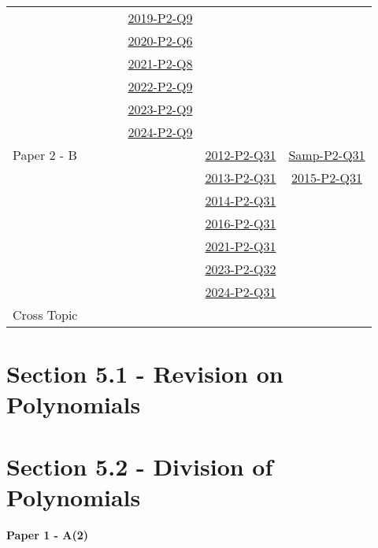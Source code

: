 \documentclass[12pt, a4paper]{article}
\begin{document}
\begin{absolutelynopagebreak}
\begin{center}
\begin{tabular}{|l|c|c|c|c|c|c|}
&  &  &  & \hyperref[DSE2019-CoreP2-Q09]{2019-P2-Q9} &  &  \\
&  &  &  & \hyperref[DSE2020-CoreP2-Q06]{2020-P2-Q6} &  &  \\
&  &  &  & \hyperref[DSE2021-CoreP2-Q08]{2021-P2-Q8} &  &  \\
&  &  &  & \hyperref[DSE2022-CoreP2-Q09]{2022-P2-Q9} &  &  \\
&  &  &  & \hyperref[DSE2023-CoreP2-Q09]{2023-P2-Q9} &  &  \\
&  &  &  & \hyperref[DSE2024-CoreP2-Q09]{2024-P2-Q9} &  &  \\
\hline
Paper 2 - B&  &  &  &  & \hyperref[DSE2012-CoreP2-Q31]{2012-P2-Q31} & \hyperref[DSE2012S-CoreP2-Q31]{Samp-P2-Q31} \\
&  &  &  &  & \hyperref[DSE2013-CoreP2-Q31]{2013-P2-Q31} & \hyperref[DSE2015-CoreP2-Q31]{2015-P2-Q31} \\
&  &  &  &  & \hyperref[DSE2014-CoreP2-Q31]{2014-P2-Q31} &  \\
&  &  &  &  & \hyperref[DSE2016-CoreP2-Q31]{2016-P2-Q31} &  \\
&  &  &  &  & \hyperref[DSE2021-CoreP2-Q31]{2021-P2-Q31} &  \\
&  &  &  &  & \hyperref[DSE2023-CoreP2-Q32]{2023-P2-Q32} &  \\
&  &  &  &  & \hyperref[DSE2024-CoreP2-Q31]{2024-P2-Q31} &  \\
\hline
\hline
Cross Topic&  &  &  &  &  &  \\
\hline
\end{tabular}
\end{center}
\end{absolutelynopagebreak}




\section*{Section 5.1 - Revision on Polynomials }\label{section:4-5-1}





\section*{Section 5.2 - Division of Polynomials}\label{section:4-5-2}

\textbf{Paper 1 - A(2)}
\begin{enumx}[label=\arabic*.,start=1]
\item {}\label{DSE2012S-CoreP1-Q10} 
\item {}\label{DSE2013-CoreP1-Q12} 
\end{enumx}
\end{document}
